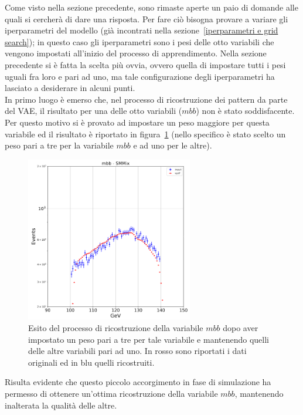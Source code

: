 Come visto nella sezione precedente, sono rimaste aperte un paio di domande alle quali si cercherà di dare una risposta. Per fare ciò bisogna provare a variare gli iperparametri del modello (già incontrati nella sezione~\ref{iperparametri e grid search}); in questo caso gli iperparametri sono i pesi delle otto variabili che vengono impostati all'inizio del processo di apprendimento. Nella sezione precedente si è fatta la scelta più ovvia, ovvero quella di impostare tutti i pesi uguali fra loro e pari ad uno, ma tale configurazione degli iperparametri ha lasciato a desiderare in alcuni punti. \\
In primo luogo è emerso che, nel processo di ricostruzione dei pattern da parte del VAE, il risultato per una delle otto variabili ($\textit{mbb}$) non è stato soddisfacente. Per questo motivo si è provato ad impostare un peso maggiore per questa variabile ed il risultato è riportato in figura~\ref{mbb_ottimizzazione} (nello specifico è stato scelto un peso pari a tre per la variabile $\textit{mbb}$ e ad uno per le altre).

\begin{figure}[h!]
	\centering
	\includegraphics[width=0.65\textwidth]{figs/risultati_simulazione/verifica_mbb.png}
	\caption{Esito del processo di ricostruzione della variabile $\textit{mbb}$ dopo aver impostato un peso pari a tre per tale variabile e mantenendo quelli delle altre variabili pari ad uno. In rosso sono riportati i dati originali ed in blu quelli ricostruiti.}
	\label{mbb_ottimizzazione}
\end{figure}

Risulta evidente che questo piccolo accorgimento in fase di simulazione ha permesso di ottenere un'ottima ricostruzione della variabile $\textit{mbb}$, mantenendo inalterata la qualità delle altre. 

